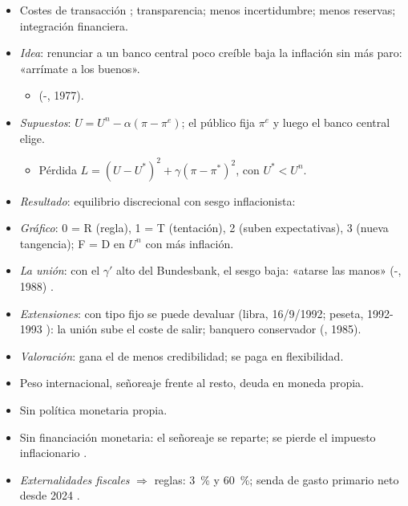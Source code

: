 \documentclass{article}
\begin{document}
\begin{columnas}
\begin{itemize}
\item Costes de transacción ; transparencia; menos incertidumbre; menos reservas; integración financiera.
\end{itemize}
\begin{itemize}
\item \emph{Idea}: renunciar a un banco central poco creíble baja la inflación sin más paro: «arrímate a los buenos».
  \begin{itemize}
  \item {} (-, 1977).
  \end{itemize}
\item \emph{Supuestos}: $U=U^n-\alpha(\pi-\pi^e)$; el público fija $\pi^e$ y luego el banco central elige.
  \begin{itemize}
  \item Pérdida $L=(U-U^*)^2+\gamma(\pi-\pi^*)^2$, con $U^*<U^n$.
  \end{itemize}
\item \emph{Resultado}: equilibrio discrecional con sesgo inflacionista:
\item \emph{Gráfico}: 0 = R (regla), 1 = T (tentación), 2 (suben expectativas), 3 (nueva tangencia); F = D en $U^n$ con más inflación.
\item \emph{La unión}: con el $\gamma'$ alto del Bundesbank, el sesgo baja: «atarse las manos» (-, 1988) .
\end{itemize}
\begin{itemize}
\item \emph{Extensiones}: con tipo fijo se puede devaluar (libra, 16/9/1992; peseta, 1992-1993 ): la unión sube el coste de salir; banquero conservador (, 1985).
\item \emph{Valoración}: gana el de menos credibilidad; se paga en flexibilidad.
\end{itemize}
\begin{itemize}
\item Peso internacional, señoreaje frente al resto, deuda en moneda propia.
\end{itemize}
\begin{itemize}
\item Sin política monetaria propia.
\item Sin financiación monetaria: el señoreaje se reparte; se pierde el impuesto inflacionario .
\item \emph{Externalidades fiscales} $\Rightarrow$ reglas: 3~\% y 60~\%; senda de gasto primario neto desde 2024 .
\end{itemize}


\end{columnas}
\end{document}
